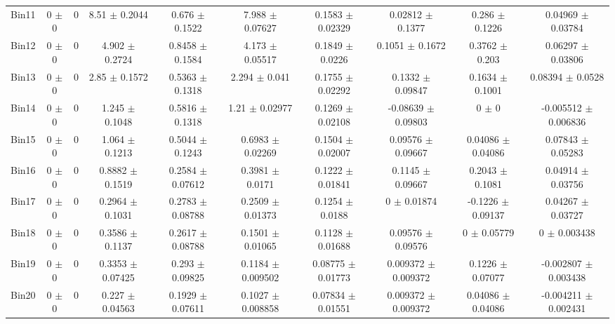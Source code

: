 \begin{tabular}{@{\extracolsep{4pt}}lccccccccc@{}}
     Bin11 & 0 $\pm$ 0 & 0 & 8.51 $\pm$ 0.2044 & 0.676 $\pm$ 0.1522 & 7.988 $\pm$ 0.07627 & 0.1583 $\pm$ 0.02329 & 0.02812 $\pm$ 0.1377 & 0.286 $\pm$ 0.1226 & 0.04969 $\pm$ 0.03784 \\ 
     Bin12 & 0 $\pm$ 0 & 0 & 4.902 $\pm$ 0.2724 & 0.8458 $\pm$ 0.1584 & 4.173 $\pm$ 0.05517 & 0.1849 $\pm$ 0.0226 & 0.1051 $\pm$ 0.1672 & 0.3762 $\pm$ 0.203 & 0.06297 $\pm$ 0.03806 \\ 
     Bin13 & 0 $\pm$ 0 & 0 & 2.85 $\pm$ 0.1572 & 0.5363 $\pm$ 0.1318 & 2.294 $\pm$ 0.041 & 0.1755 $\pm$ 0.02292 & 0.1332 $\pm$ 0.09847 & 0.1634 $\pm$ 0.1001 & 0.08394 $\pm$ 0.0528 \\ 
     Bin14 & 0 $\pm$ 0 & 0 & 1.245 $\pm$ 0.1048 & 0.5816 $\pm$ 0.1318 & 1.21 $\pm$ 0.02977 & 0.1269 $\pm$ 0.02108 & -0.08639 $\pm$ 0.09803 & 0 $\pm$ 0 & -0.005512 $\pm$ 0.006836 \\ 
     Bin15 & 0 $\pm$ 0 & 0 & 1.064 $\pm$ 0.1213 & 0.5044 $\pm$ 0.1243 & 0.6983 $\pm$ 0.02269 & 0.1504 $\pm$ 0.02007 & 0.09576 $\pm$ 0.09667 & 0.04086 $\pm$ 0.04086 & 0.07843 $\pm$ 0.05283 \\ 
     Bin16 & 0 $\pm$ 0 & 0 & 0.8882 $\pm$ 0.1519 & 0.2584 $\pm$ 0.07612 & 0.3981 $\pm$ 0.0171 & 0.1222 $\pm$ 0.01841 & 0.1145 $\pm$ 0.09667 & 0.2043 $\pm$ 0.1081 & 0.04914 $\pm$ 0.03756 \\ 
     Bin17 & 0 $\pm$ 0 & 0 & 0.2964 $\pm$ 0.1031 & 0.2783 $\pm$ 0.08788 & 0.2509 $\pm$ 0.01373 & 0.1254 $\pm$ 0.0188 & 0 $\pm$ 0.01874 & -0.1226 $\pm$ 0.09137 & 0.04267 $\pm$ 0.03727 \\ 
     Bin18 & 0 $\pm$ 0 & 0 & 0.3586 $\pm$ 0.1137 & 0.2617 $\pm$ 0.08788 & 0.1501 $\pm$ 0.01065 & 0.1128 $\pm$ 0.01688 & 0.09576 $\pm$ 0.09576 & 0 $\pm$ 0.05779 & 0 $\pm$ 0.003438 \\ 
     Bin19 & 0 $\pm$ 0 & 0 & 0.3353 $\pm$ 0.07425 & 0.293 $\pm$ 0.09825 & 0.1184 $\pm$ 0.009502 & 0.08775 $\pm$ 0.01773 & 0.009372 $\pm$ 0.009372 & 0.1226 $\pm$ 0.07077 & -0.002807 $\pm$ 0.003438 \\ 
     Bin20 & 0 $\pm$ 0 & 0 & 0.227 $\pm$ 0.04563 & 0.1929 $\pm$ 0.07611 & 0.1027 $\pm$ 0.008858 & 0.07834 $\pm$ 0.01551 & 0.009372 $\pm$ 0.009372 & 0.04086 $\pm$ 0.04086 & -0.004211 $\pm$ 0.002431 \\ 
\hline\hline
  \end{tabular}
